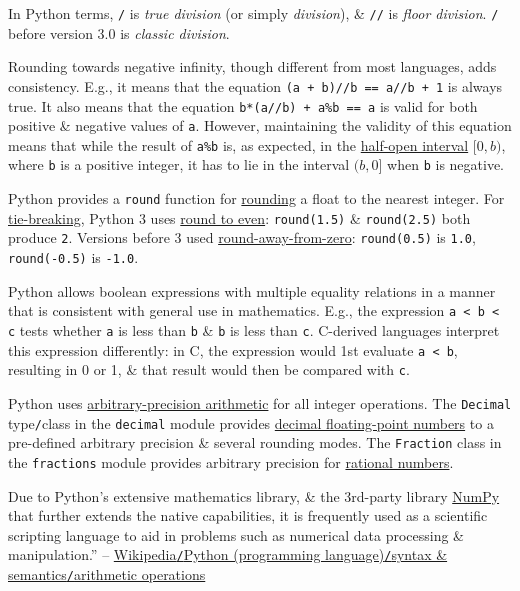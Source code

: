 \documentclass{article}
\numberwithin{equation}{section}
\begin{document}
In Python terms, \verb|/| is \textit{true division} (or simply \textit{division}), \& \verb|//| is \textit{floor division}. \verb|/| before version 3.0 is \textit{classic division}.

Rounding towards negative infinity, though different from most languages, adds consistency. E.g., it means that the equation \verb|(a + b)//b == a//b + 1| is always true. It also means that the equation \verb|b*(a//b) + a%b == a| is valid for both positive \& negative values of \texttt{a}. However, maintaining the validity of this equation means that while the result of \verb|a%b| is, as expected, in the \href{https://en.wikipedia.org/wiki/Half-open_interval}{half-open interval} $[0,b)$, where \texttt{b} is a positive integer, it has to lie in the interval $(b,0]$ when \texttt{b} is negative.

Python provides a \texttt{round} function for \href{https://en.wikipedia.org/wiki/Rounding}{rounding} a float to the nearest integer. For \href{https://en.wikipedia.org/wiki/Rounding#Tie-breaking}{tie-breaking}, Python 3 uses \href{https://en.wikipedia.org/wiki/Round_to_even}{round to even}: \verb|round(1.5)| \& \verb|round(2.5)| both produce \texttt{2}. Versions before 3 used \href{https://en.wikipedia.org/wiki/Rounding#Rounding_away_from_zero}{round-away-from-zero}: \verb|round(0.5)| is \texttt{1.0}, \verb|round(-0.5)| is \texttt{-1.0}.

Python allows boolean expressions with multiple equality relations in a manner that is consistent with general use in mathematics. E.g., the expression \texttt{a < b < c} tests whether \texttt{a} is less than \texttt{b} \& \texttt{b} is less than \texttt{c}. C-derived languages interpret this expression differently: in C, the expression would 1st evaluate \texttt{a < b}, resulting in 0  or 1, \& that result would then be compared with \texttt{c}.

Python uses \href{https://en.wikipedia.org/wiki/Arbitrary-precision_arithmetic}{arbitrary-precision arithmetic} for all integer operations. The \texttt{Decimal} type\texttt{/}class in the \texttt{decimal} module provides \href{https://en.wikipedia.org/wiki/Decimal_floating_point}{decimal floating-point numbers} to a pre-defined arbitrary precision \& several rounding modes. The \texttt{Fraction} class in the \texttt{fractions} module provides arbitrary precision for \href{https://en.wikipedia.org/wiki/Rational_number}{rational numbers}.

Due to Python's extensive mathematics library, \& the 3rd-party library \href{https://en.wikipedia.org/wiki/NumPy}{NumPy} that further extends the native capabilities, it is frequently used as a scientific scripting language to aid in problems such as numerical data processing \& manipulation.'' -- \href{https://en.wikipedia.org/wiki/Python_(programming_language)#Arithmetic_operations}{Wikipedia\texttt{/}Python (programming language)\texttt{/}syntax \& semantics\texttt{/}arithmetic operations}
\end{document}

